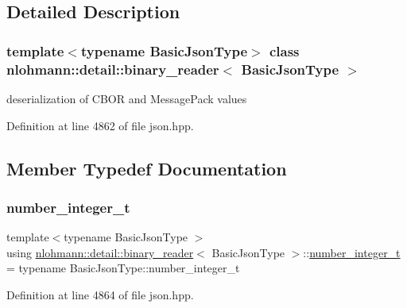 \subsection{Detailed Description}
\subsubsection*{template$<$typename Basic\+Json\+Type$>$\newline
class nlohmann\+::detail\+::binary\+\_\+reader$<$ Basic\+Json\+Type $>$}

deserialization of C\+B\+OR and Message\+Pack values 

Definition at line 4862 of file json.\+hpp.



\subsection{Member Typedef Documentation}
\mbox{\label{classnlohmann_1_1detail_1_1binary__reader_ac6065302a10df2e78ed23a0e02e832bf}} 
\subsubsection{\texorpdfstring{number\+\_\+integer\+\_\+t}{number\_integer\_t}}
{\footnotesize\ttfamily template$<$typename Basic\+Json\+Type $>$ \\
using \hyperlink{classnlohmann_1_1detail_1_1binary__reader}{nlohmann\+::detail\+::binary\+\_\+reader}$<$ Basic\+Json\+Type $>$\+::\hyperlink{classnlohmann_1_1detail_1_1binary__reader_ac6065302a10df2e78ed23a0e02e832bf}{number\+\_\+integer\+\_\+t} =  typename Basic\+Json\+Type\+::number\+\_\+integer\+\_\+t\hspace{0.3cm}{\ttfamily [private]}}



Definition at line 4864 of file json.\+hpp.

\mbox{\label{classnlohmann_1_1detail_1_1binary__reader_a6e87a28ccbfdb4afcc2c93df9f9dbe74}} 
